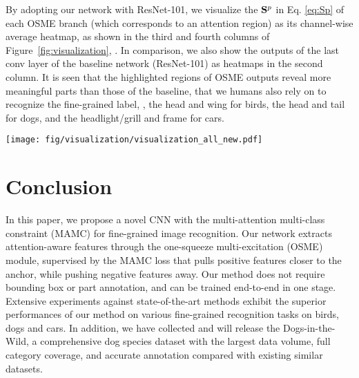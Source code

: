 \documentclass[runningheads]{llncs}
\begin{document}
By adopting our network with ResNet-101, we visualize the $\mathbf{S}^p$ in Eq. \ref{eq:Sp} of each OSME branch (which corresponds to an attention region) as its channel-wise average heatmap, as shown in the third and fourth columns of Figure~\ref{fig:visualization}, .
In comparison, we also show the outputs of the last conv layer of the baseline network (ResNet-101) as heatmaps in the second column.
It is seen that the highlighted regions of OSME outputs reveal more meaningful parts than those of the baseline, that we humans also rely on to recognize the fine-grained label, \eg, the head and wing for birds, the head and tail for dogs, and the headlight/grill and frame for cars.

\begin{figure*}[t]
	\centering
	\texttt{[image: fig/visualization/visualization\_all\_new.pdf]}
	\caption{Visualization of the attention regions detected by the OSME. For each dataset, the first column shows the input image, the second column shows the heatmap from the last conv layer of the baseline ResNet-101; the third and fourth columns show the heatmaps of the two detected attention regions via OSME.}
	\label{fig:visualization}
        \vspace{-.1in}
\end{figure*}

\vspace{-.1in}
\section{Conclusion}
\label{conclustion}

In this paper, we propose a novel CNN with the multi-attention multi-class constraint (MAMC) for fine-grained image recognition.
Our network extracts attention-aware features through the one-squeeze multi-excitation (OSME) module, supervised by the MAMC loss that pulls positive features closer to the anchor, while pushing negative features away.
Our method does not require bounding box or part annotation, and can be trained end-to-end in one stage.
Extensive experiments against state-of-the-art methods exhibit the superior performances of our method on various fine-grained recognition tasks on birds, dogs and cars.
In addition, we have collected and will release the Dogs-in-the-Wild, a comprehensive dog species dataset with the largest data volume, full category coverage, and accurate annotation compared with existing similar datasets.





\end{document}
